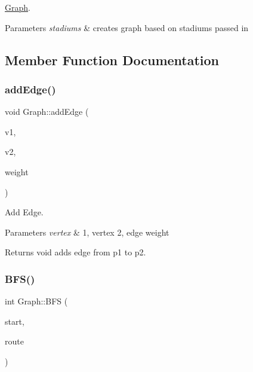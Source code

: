 \hyperlink{class_graph}{Graph}. 


\begin{DoxyParams}{Parameters}
{\em stadiums} & creates graph based on stadiums passed in \\
\hline
\end{DoxyParams}


\subsection{Member Function Documentation}
\mbox{\label{class_graph_aba11741e1190c29cea65db0c88cb8e9a}} 
\subsubsection{\texorpdfstring{add\+Edge()}{addEdge()}}
{\footnotesize\ttfamily void Graph\+::add\+Edge (\begin{DoxyParamCaption}\item[{int}]{v1,  }\item[{int}]{v2,  }\item[{int}]{weight }\end{DoxyParamCaption})}



Add Edge. 


\begin{DoxyParams}{Parameters}
{\em vertex} & 1, vertex 2, edge weight \\
\hline
\end{DoxyParams}
\begin{DoxyReturn}{Returns}
void  adds edge from p1 to p2. 
\end{DoxyReturn}
\mbox{\label{class_graph_a97dda4b96f3b3b07cfcb95461fc6bd9b}} 
\subsubsection{\texorpdfstring{B\+F\+S()}{BFS()}}
{\footnotesize\ttfamily int Graph\+::\+B\+FS (\begin{DoxyParamCaption}\item[{Q\+String}]{start,  }\item[{std\+::vector$<$ Q\+String $>$ $\ast$}]{route }\end{DoxyParamCaption})}



